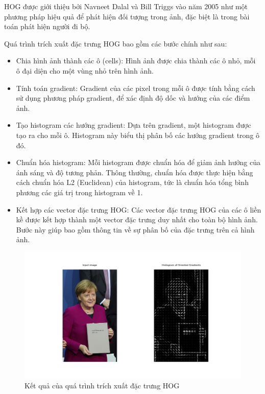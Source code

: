 HOG được giới thiệu bởi Navneet Dalal và Bill Triggs vào năm 2005 như một phương pháp hiệu quả để phát hiện đối tượng trong ảnh, đặc biệt là trong bài toán phát hiện người đi bộ.   

Quá trình trích xuất đặc trưng HOG bao gồm các bước chính như sau:
\begin{itemize}[noitemsep, topsep=0pt, leftmargin=1.25em, label={$-$}]
    \item Chia hình ảnh thành các ô (cells): Hình ảnh được chia thành các ô nhỏ, mỗi ô đại diện cho một vùng nhỏ trên hình ảnh.
    \item Tính toán gradient: Gradient của các pixel trong mỗi ô được tính bằng cách sử dụng phương pháp gradient, để xác định độ dốc và hướng của các điểm ảnh. 
    \item Tạo histogram các hướng gradient: Dựa trên gradient, một histogram được tạo ra cho mỗi ô. Histogram này biểu thị phân bố các hướng gradient trong ô đó. 
    \item Chuẩn hóa histogram: Mỗi histogram được chuẩn hóa để giảm ảnh hưởng của ánh sáng và độ tương phản. Thông thường, chuẩn hóa được thực hiện bằng cách chuẩn hóa L2 (Euclidean) của histogram, tức là chuẩn hóa tổng bình phương các giá trị trong histogram về 1.
    \item Kết hợp các vector đặc trưng HOG: Các vector đặc trưng HOG của các ô liền kề được kết hợp thành một vector đặc trưng duy nhất cho toàn bộ hình ảnh. Bước này giúp bao gồm thông tin về sự phân bố của đặc trưng trên cả hình ảnh.
\end{itemize}
\pagebreak
\begin{figure}[h!]
  \centering
  \includegraphics[scale=0.35]{graphics/HOG.jpeg}
  \caption{Kết quả của quá trình trích xuất đặc trưng HOG}
\end{figure}

